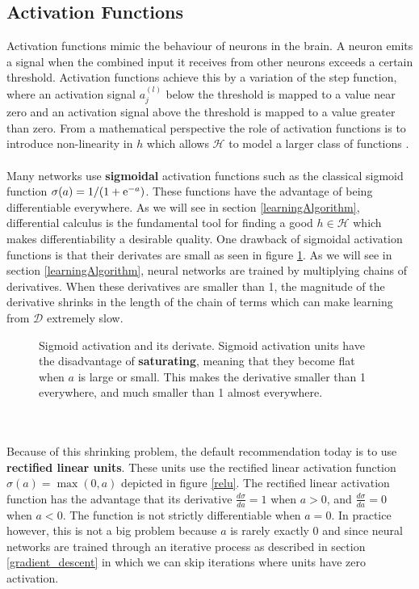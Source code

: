 \subsection{Activation Functions}
\label{activation_functions}
Activation functions mimic the behaviour of neurons in the brain. A neuron emits a signal when the combined input it receives from other neurons exceeds a certain threshold. Activation functions achieve this by a variation of the step function, where an activation signal $a^{(l)}_j$ below the threshold is mapped to a value near zero and an activation signal above the threshold is mapped to a value greater than zero. From a mathematical perspective the role of activation functions is to introduce non-linearity in $h$ which allows $\mathcal{H}$ to model a larger class of functions \citep{goodfellow16}.
\\\\
Many networks use \textbf{sigmoidal} activation functions such as the classical sigmoid function $\sigma(a) = 1/(1 + \mathrm{e}^{-a})$. These functions have the advantage of being differentiable everywhere. As we will see in section \ref{learningAlgorithm}, differential calculus is the fundamental tool for finding a good $h \in \mathcal{H}$ which makes differentiability a desirable quality. One drawback of sigmoidal activation functions is that their derivates are small as seen in figure \ref{sigmoid}. As we will see in section \ref{learningAlgorithm}, neural networks are trained by multiplying chains of derivatives. When these derivatives are smaller than 1, the magnitude of the derivative shrinks in the length of the chain of terms which can make learning from $\mathcal{D}$ extremely slow.
\begin{figure}
	\centering
	
	\caption{Sigmoid activation and its derivate. Sigmoid activation units have the disadvantage of \textbf{saturating}, meaning that they become flat when $a$ is large or small. This makes the derivative smaller than 1 everywhere, and much smaller than 1 almost everywhere.}
	\label{sigmoid}
\end{figure}
\\\\
Because of this shrinking problem, the default recommendation today is to use \textbf{rectified linear units}. These units use the rectified linear activation function $\sigma(a) = \max(0, a)$ depicted in figure \ref{relu}. The rectified linear activation function has the advantage that its derivative $\frac{d\sigma}{da} = 1$ when $a > 0$, and $\frac{d\sigma}{da} = 0$ when $a < 0$. The function is not strictly differentiable when $a = 0$. In practice however, this is not a big problem because $a$ is rarely exactly 0 and since neural networks are trained through an iterative process as described in section \ref{gradient_descent} in which we can skip iterations where units have zero activation.
